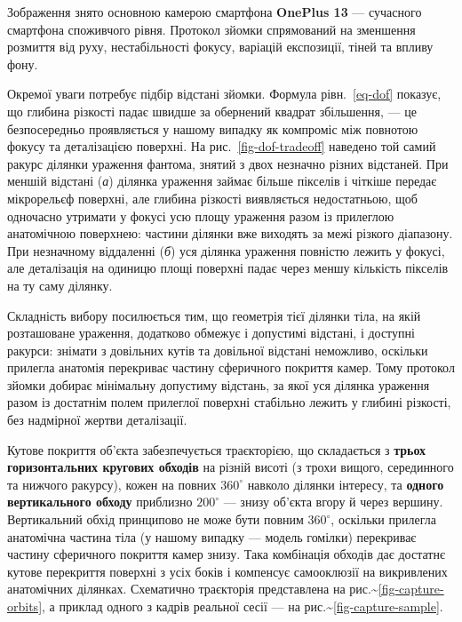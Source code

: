\documentclass[
  ukrainian,
  10pt,
  a4paper,
  twocolumn]{article}
\begin{document}
Зображення знято основною камерою смартфона \textbf{OnePlus 13} ---
сучасного смартфона споживчого рівня. Протокол зйомки спрямований на
зменшення розмиття від руху, нестабільності фокусу, варіацій експозиції,
тіней та впливу фону.

Окремої уваги потребує підбір відстані зйомки. Формула
рівн.~\ref{eq-dof} показує, що глибина різкості падає швидше за
обернений квадрат збільшення, --- це безпосередньо проявляється у нашому
випадку як компроміс між повнотою фокусу та деталізацією поверхні. На
рис.~\ref{fig-dof-tradeoff} наведено той самий ракурс ділянки ураження
фантома, знятий з двох незначно різних відстаней. При меншій відстані
(\emph{а}) ділянка ураження займає більше пікселів і чіткіше передає
мікрорельєф поверхні, але глибина різкості виявляється недостатньою, щоб
одночасно утримати у фокусі усю площу ураження разом із прилеглою
анатомічною поверхнею: частини ділянки вже виходять за межі різкого
діапазону. При незначному віддаленні (\emph{б}) уся ділянка ураження
повністю лежить у фокусі, але деталізація на одиницю площі поверхні
падає через меншу кількість пікселів на ту саму ділянку.

Складність вибору посилюється тим, що геометрія тієї ділянки тіла, на
якій розташоване ураження, додатково обмежує і допустимі відстані, і
доступні ракурси: знімати з довільних кутів та довільної відстані
неможливо, оскільки прилегла анатомія перекриває частину сферичного
покриття камер. Тому протокол зйомки добирає мінімальну допустиму
відстань, за якої уся ділянка ураження разом із достатнім полем
прилеглої поверхні стабільно лежить у глибині різкості, без надмірної
жертви деталізації.

Кутове покриття об'єкта забезпечується траєкторією, що складається з
\textbf{трьох горизонтальних кругових обходів} на різній висоті (з трохи
вищого, серединного та нижчого ракурсу), кожен на повних \(360^\circ\)
навколо ділянки інтересу, та \textbf{одного вертикального обходу}
приблизно \(200^\circ\) --- знизу об'єкта вгору й через вершину.
Вертикальний обхід принципово не може бути повним \(360^\circ\),
оскільки прилегла анатомічна частина тіла (у нашому випадку --- модель
гомілки) перекриває частину сферичного покриття камер знизу. Така
комбінація обходів дає достатнє кутове перекриття поверхні з усіх боків
і компенсує самооклюзії на викривлених анатомічних ділянках. Схематично
траєкторія представлена на
рис.\textasciitilde{}\ref{fig-capture-orbits}, а приклад одного з кадрів
реальної сесії --- на рис.\textasciitilde{}\ref{fig-capture-sample}.
\end{document}
